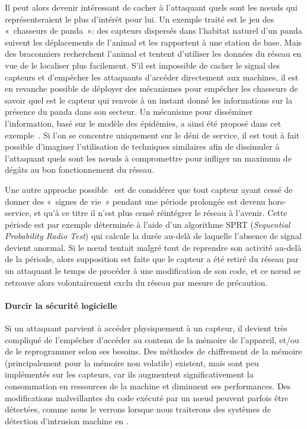Il peut alors devenir intéressant de cacher à l'attaquant quels sont les nœuds qui représenteraient le plus d'intérêt pour lui.
Un exemple traité est le jeu des « chasseurs de panda »: des capteurs dispersés dans l'habitat naturel d'un panda suivent les déplacements de l'animal et les rapportent à une station de base.
Mais des braconniers recherchent l'animal et tentent d'utiliser les données du réseau en vue de le localiser plus facilement.
S'il est impossible de cacher le signal des capteurs et d'empêcher les attaquants d'accéder directement aux machines, il est en revanche possible de déployer des mécanismes pour empêcher les chasseurs de savoir quel est le capteur qui renvoie à un instant donné les informations sur la présence du panda dans son secteur.
Un mécanisme pour disséminer l'information, basé sur le modèle des épidémies, a ainsi été proposé dans cet exemple~\cite{KDA14}.
Si l'on se concentre uniquement sur le déni de service, il est tout à fait possible d'imaginer l'utilisation de techniques similaires afin de dissimuler à l'attaquant quels sont les nœuds à compromettre pour infliger un maximum de dégâts au bon fonctionnement du réseau.

Une autre approche possible~\cite{Ho10} est de considérer que tout capteur ayant cessé de donner des « signes de vie » pendant une période prolongée est devenu hors-service, et qu'à ce titre il n'est plus censé réintégrer le réseau à l'avenir.
Cette période est par exemple déterminée à l'aide d'un algorithme SPRT (\textit{Sequential Probability Radio Test}) qui calcule la durée au-delà de laquelle l'absence de signal devient anormal.
Si le nœud tentait malgré tout de reprendre son activité au-delà de la période, alors supposition est faite que le capteur a été retiré du réseau par un attaquant le temps de procéder à une modification de son code, et ce nœud se retrouve alors volontairement exclu du réseau par mesure de précaution.

        \paragraph{Durcir la sécurité logicielle}
Si un attaquant parvient à accéder physiquement à un capteur, il devient très compliqué de l'empêcher d'accéder au contenu de la mémoire de l'appareil, et/ou de le reprogrammer selon ses besoins.
Des méthodes de chiffrement de la mémoire (principalement pour la mémoire non volatile) existent, mais sont peu implémentés sur les capteurs, car ils augmentent significativement la consommation en ressources de la machine et diminuent ses performances.
Des modifications malveillantes du code exécuté par un nœud peuvent parfois être détectées, comme nous le verrons lorsque nous traiterons des systèmes de détection d'intrusion machine en .


